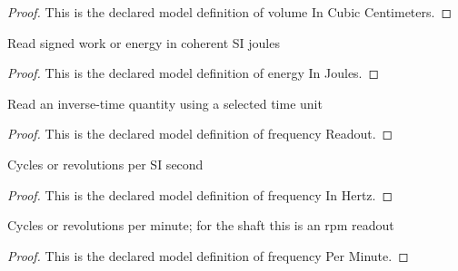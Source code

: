 \begin{proof}
  This is the declared model definition of volume In Cubic Centimeters.
\end{proof}
\begin{definition}
  \label{def:physics:phyx-mini-0426:phyxminiproblems-problemphyxmini0426-energyinjoules}
  Read signed work or energy in coherent SI joules
\end{definition}
\begin{proof}
  This is the declared model definition of energy In Joules.
\end{proof}
\begin{definition}
  \label{def:physics:phyx-mini-0426:phyxminiproblems-problemphyxmini0426-frequencyreadout}
  Read an inverse-time quantity using a selected time unit
\end{definition}
\begin{proof}
  This is the declared model definition of frequency Readout.
\end{proof}
\begin{definition}
  \label{def:physics:phyx-mini-0426:phyxminiproblems-problemphyxmini0426-frequencyinhertz}
  Cycles or revolutions per SI second
\end{definition}
\begin{proof}
  This is the declared model definition of frequency In Hertz.
\end{proof}
\begin{definition}
  \label{def:physics:phyx-mini-0426:phyxminiproblems-problemphyxmini0426-frequencyperminute}
  Cycles or revolutions per minute; for the shaft this is an rpm readout
\end{definition}
\begin{proof}
  This is the declared model definition of frequency Per Minute.
\end{proof}
